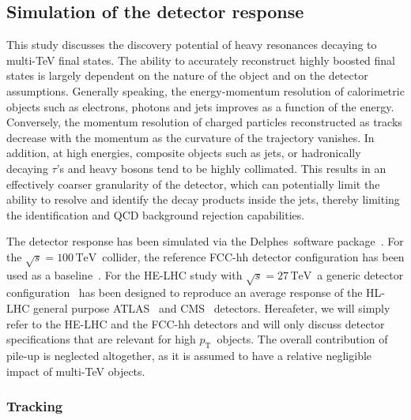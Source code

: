 \documentclass[a4paper,11pt]{article}
\newcommand{\pt}{\ensuremath{p_{\text{T}}}}
\newcommand*{\sqrtshelhc}{\ensuremath{\sqrt{s}=27\,\text{TeV}}}
\newcommand*{\sqrtsfcc}{\ensuremath{\sqrt{s}=100\,\text{TeV}}}
\newcommand{\delphes}{{\sc Delphes}}
\begin{document}
\subsection{Simulation of the detector response}
\label{subsec:detparam}

This study discusses the discovery potential of heavy resonances decaying to multi-TeV final states. The ability to accurately reconstruct highly boosted final states is largely dependent on the nature of the object and on the detector assumptions. Generally speaking, the energy-momentum resolution of calorimetric objects such as electrons, photons and jets improves as a function of the energy. Conversely, the momentum resolution of charged particles reconstructed as tracks decrease with the momentum as the curvature of the trajectory vanishes. In addition, at high energies, composite objects such as jets, or hadronically decaying $\tau$'s and heavy bosons tend to be highly collimated. This results in an effectively coarser granularity of the detector, which can potentially limit the ability to resolve and identify the decay products inside the jets, thereby limiting the identification and QCD background rejection capabilities. 

The detector response has been simulated via the \delphes{}~software package~\cite{deFavereau:2013fsa}. For the \sqrtsfcc\ collider, the reference FCC-hh detector configuration has been used as a baseline~\cite{cdr_volume3, delphes_card_fcc}. For the HE-LHC study with \sqrtshelhc\, a generic detector configuration~\cite{delphes_card_helhc} has been designed to reproduce an average response of the HL-LHC general purpose ATLAS~\cite{Aad:2008zzm,Capeans:2010jnh} and CMS~\cite{Chatrchyan:2008aa} detectors. Hereafeter, we will simply refer to the HE-LHC and the FCC-hh detectors and will only discuss detector specifications that are relevant for high \pt\ objects. The overall contribution of pile-up is neglected altogether, as it is assumed to have a relative negligible impact of multi-TeV objects.

\subsubsection{Tracking}
\label{appsub:tracking}
\end{document}
